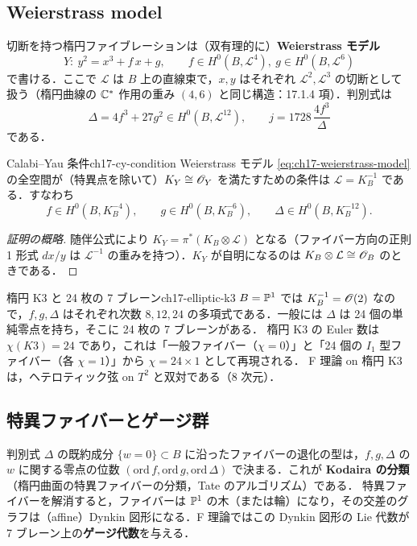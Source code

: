\subsection{Weierstrass model}

切断を持つ楕円ファイブレーションは（双有理的に）\textbf{Weierstrass モデル}
\begin{equation}
Y:\ y^2=x^3+f\,x+g,\qquad f\in H^0(B,\mathcal{L}^{4}),\ g\in H^0(B,\mathcal{L}^{6})
\label{eq:ch17-weierstrass-model}
\end{equation}
で書ける．ここで $\mathcal{L}$ は $B$ 上の直線束で，$x,y$ はそれぞれ $\mathcal{L}^2,\mathcal{L}^3$ の切断として扱う（楕円曲線の $\mathbb{C}^*$ 作用の重み $(4,6)$ と同じ構造：17.1.4 項）．判別式は
\[
\Delta=4f^3+27g^2\in H^0(B,\mathcal{L}^{12}),\qquad j=1728\,\frac{4f^3}{\Delta}
\]
である．

\begin{myprop}{Calabi--Yau 条件}{ch17-cy-condition}
Weierstrass モデル \eqref{eq:ch17-weierstrass-model} の全空間が（特異点を除いて）$K_Y\cong\mathscr{O}_Y$ を満たすための条件は $\mathcal{L}=K_B^{-1}$ である．すなわち
\[
f\in H^0(B,K_B^{-4}),\qquad g\in H^0(B,K_B^{-6}),\qquad \Delta\in H^0(B,K_B^{-12}).
\]
\end{myprop}

\begin{proof}[証明の概略]
随伴公式により $K_Y=\pi^*(K_B\otimes\mathcal{L})$ となる（ファイバー方向の正則 1 形式 $dx/y$ は $\mathcal{L}^{-1}$ の重みを持つ）．$K_Y$ が自明になるのは $K_B\otimes\mathcal{L}\cong\mathscr{O}_B$ のときである．
\end{proof}

\begin{myex}{楕円 K3 と 24 枚の 7 ブレーン}{ch17-elliptic-k3}
$B=\mathbb{P}^1$ では $K_B^{-1}=\mathscr{O}(2)$ なので，$f,g,\Delta$ はそれぞれ次数 $8,12,24$ の多項式である．一般には $\Delta$ は 24 個の単純零点を持ち，そこに 24 枚の 7 ブレーンがある．
楕円 K3 の Euler 数は $\chi(K3)=24$ であり，これは「一般ファイバー（$\chi=0$）」と「24 個の $I_1$ 型ファイバー（各 $\chi=1$）」から $\chi=24\times1$ として再現される．
F 理論 on 楕円 K3 は，ヘテロティック弦 on $T^2$ と双対である（8 次元）．
\end{myex}

\subsection{特異ファイバーとゲージ群}

判別式 $\Delta$ の既約成分 $\{w=0\}\subset B$ に沿ったファイバーの退化の型は，$f,g,\Delta$ の $w$ に関する零点の位数 $(\mathrm{ord}\,f,\mathrm{ord}\,g,\mathrm{ord}\,\Delta)$ で決まる．これが \textbf{Kodaira の分類}（楕円曲面の特異ファイバーの分類，Tate のアルゴリズム）である．
特異ファイバーを解消すると，ファイバーは $\mathbb{P}^1$ の木（または輪）になり，その交差のグラフは（affine）Dynkin 図形になる．F 理論ではこの Dynkin 図形の Lie 代数が 7 ブレーン上の\textbf{ゲージ代数}を与える．

